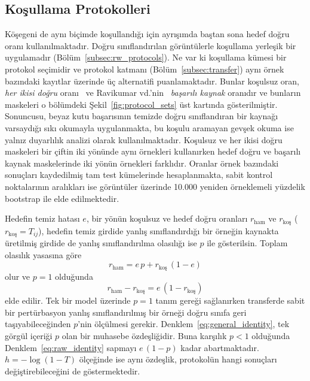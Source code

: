 \subsection{Koşullama Protokolleri}
\label{subsec:metrics}

Köşegeni de aynı biçimde koşullandığı için ayrışımda baştan sona hedef doğru oranı kullanılmaktadır. Doğru sınıflandırılan görüntülerle koşullama yerleşik bir uygulamadır (Bölüm~\ref{subsec:rw_protocols}). Ne var ki koşullama kümesi bir protokol seçimidir ve protokol katmanı (Bölüm~\ref{subsec:transfer}) aynı örnek bazındaki kayıtlar üzerinde üç alternatifi puanlamaktadır. Bunlar koşulsuz oran, \emph{her ikisi doğru} oranı~\cite{mahmood2021robustness, ravikumar2023trend} ve Ravikumar vd.'nin~\cite{ravikumar2023trend} \emph{başarılı kaynak} oranıdır ve bunların maskeleri o bölümdeki Şekil~\ref{fig:protocol_sets} üst kartında gösterilmiştir. Sonuncusu, beyaz kutu başarısının temizde doğru sınıflandıran bir kaynağı varsaydığı sıkı okumayla uygulanmakta, bu koşulu aramayan gevşek okuma ise yalnız duyarlılık analizi olarak kullanılmaktadır. Koşulsuz ve her ikisi doğru maskeleri bir çiftin iki yönünde aynı örnekleri kullanırken hedef doğru ve başarılı kaynak maskelerinde iki yönün örnekleri farklıdır. Oranlar örnek bazındaki sonuçları kaydedilmiş tam test kümelerinde hesaplanmakta, sabit kontrol noktalarının aralıkları ise görüntüler üzerinde 10.000 yeniden örneklemeli yüzdelik bootstrap ile elde edilmektedir.

Hedefin temiz hatası $e$, bir yönün koşulsuz ve hedef doğru oranları $r_{\text{ham}}$ ve $r_{\text{koş}}$ ($r_{\text{koş}} = T_{ij}$), hedefin temiz girdide yanlış sınıflandırdığı bir örneğin kaynakta üretilmiş girdide de yanlış sınıflandırılma olasılığı ise $p$ ile gösterilsin. Toplam olasılık yasasına göre
\begin{equation}
r_{\text{ham}} = e\,p + r_{\text{koş}}\,(1 - e)
\label{eq:general_identity}
\end{equation}
olur ve $p=1$ olduğunda
\begin{equation}
r_{\text{ham}} - r_{\text{koş}} = e\,(1 - r_{\text{koş}})
\label{eq:raw_identity}
\end{equation}
elde edilir. Tek bir model üzerinde $p=1$ tanım gereği sağlanırken transferde sabit bir pertürbasyon yanlış sınıflandırılmış bir örneği doğru sınıfa geri taşıyabileceğinden $p$'nin ölçülmesi gerekir. Denklem~\eqref{eq:general_identity}, tek görgül içeriği $p$ olan bir muhasebe özdeşliğidir. Buna karşılık $p<1$ olduğunda Denklem~\eqref{eq:raw_identity} sapmayı $e\,(1-p)$ kadar abartmaktadır. $h = -\log(1-T)$ ölçeğinde ise aynı özdeşlik, protokolün hangi sonuçları değiştirebileceğini de göstermektedir.

